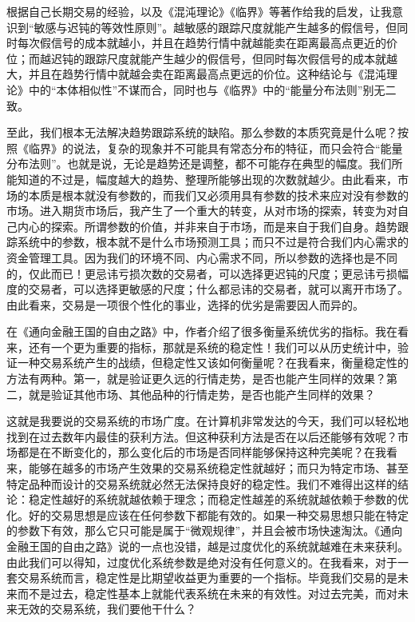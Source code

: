 根据自己长期交易的经验，以及《混沌理论》《临界》等著作给我的启发，让我意识到“敏感与迟钝的等效性原则”。越敏感的跟踪尺度就能产生越多的假信号，但同时每次假信号的成本就越小，并且在趋势行情中就越能卖在距离最高点更近的价位；而越迟钝的跟踪尺度就能产生越少的假信号，但同时每次假信号的成本就越大，并且在趋势行情中就越会卖在距离最高点更远的价位。这种结论与《混沌理论》中的“本体相似性”不谋而合，同时也与《临界》中的“能量分布法则”别无二致。

至此，我们根本无法解决趋势跟踪系统的缺陷。那么参数的本质究竟是什么呢？按照《临界》的说法，复杂的现象并不可能具有常态分布的特征，而只会符合“能量分布法则”。也就是说，无论是趋势还是调整，都不可能存在典型的幅度。我们所能知道的不过是，幅度越大的趋势、整理所能够出现的次数就越少。由此看来，市场的本质是根本就没有参数的，而我们又必须用具有参数的技术来应对没有参数的市场。进入期货市场后，我产生了一个重大的转变，从对市场的探索，转变为对自己内心的探索。所谓参数的价值，并非来自于市场，而是来自于我们自身。趋势跟踪系统中的参数，根本就不是什么市场预测工具；而只不过是符合我们内心需求的资金管理工具。因为我们的环境不同、内心需求不同，所以参数的选择也是不同的，仅此而已！更忌讳亏损次数的交易者，可以选择更迟钝的尺度；更忌讳亏损幅度的交易者，可以选择更敏感的尺度；什么都忌讳的交易者，就可以离开市场了。由此看来，交易是一项很个性化的事业，选择的优劣是需要因人而异的。

在《通向金融王国的自由之路》中，作者介绍了很多衡量系统优劣的指标。我在看来，还有一个更为重要的指标，那就是系统的稳定性！我们可以从历史统计中，验证一种交易系统产生的战绩，但稳定性又该如何衡量呢？在我看来，衡量稳定性的方法有两种。第一，就是验证更久远的行情走势，是否也能产生同样的效果？第二，就是验证其他市场、其他品种的行情走势，是否也能产生同样的效果？

这就是我要说的交易系统的市场广度。在计算机非常发达的今天，我们可以轻松地找到在过去数年内最佳的获利方法。但这种获利方法是否在以后还能够有效呢？市场都是在不断变化的，那么变化后的市场是否同样能够保持这种完美呢？在我看来，能够在越多的市场产生效果的交易系统稳定性就越好；而只为特定市场、甚至特定品种而设计的交易系统就必然无法保持良好的稳定性。我们不难得出这样的结论：稳定性越好的系统就越依赖于理念；而稳定性越差的系统就越依赖于参数的优化。好的交易思想是应该在任何参数下都能有效的。如果一种交易思想只能在特定的参数下有效，那么它只可能是属于“微观规律”，并且会被市场快速淘汰。《通向金融王国的自由之路》说的一点也没错，越是过度优化的系统就越难在未来获利。由此我们可以得知，过度优化系统参数是绝对没有任何意义的。在我看来，对于一套交易系统而言，稳定性是比期望收益更为重要的一个指标。毕竟我们交易的是未来而不是过去，稳定性基本上就能代表系统在未来的有效性。对过去完美，而对未来无效的交易系统，我们要他干什么？

